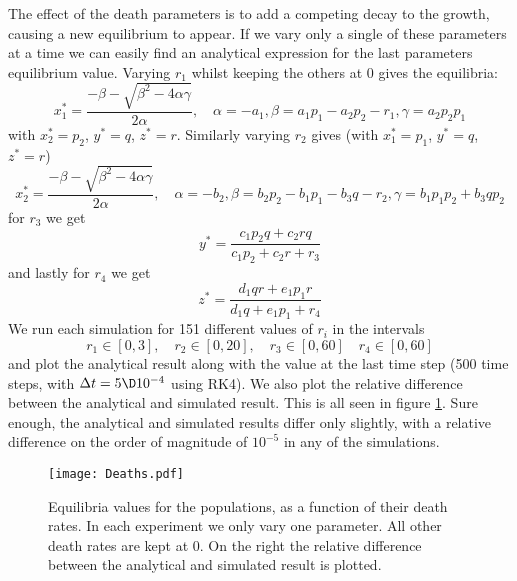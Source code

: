 \documentclass[a4paper,10pt]{article}
\begin{document}
	The effect of the death parameters is to add a competing decay to the growth, causing a new equilibrium to appear. If we vary only a single of these parameters at a time we can easily find an analytical expression for the last parameters equilibrium value. Varying $ r_1 $ whilst keeping the others at 0 gives the equilibria:
	\begin{equation}\label{key}
		x_1^* = \frac{-\beta - \sqrt{\beta^2 - 4\alpha \gamma}}{2 \alpha}, \quad \alpha=-a_1, \beta = a_1p_1-a_2p_2-r_1, \gamma =a_2p_2p_1
	\end{equation}
	with $ x_2^* = p_2 $, $ y^* = q $, $ z^* = r $. Similarly varying $ r_2 $ gives (with $ x_1^* = p_1 $, $ y^* = q $, $ z^* = r $)
	\begin{equation}\label{key}
		x_2^* = \frac{-\beta - \sqrt{\beta^2 - 4\alpha \gamma}}{2 \alpha}, \quad \alpha=-b_2, \beta = b_2p_2-b_1p_1-b_3q-r_2, \gamma =b_1p_1p_2 + b_3qp_2
	\end{equation}
	for $ r_3 $ we get
	\begin{equation}\label{key}
		y^* = \frac{c_1p_2q+c_2rq}{c_1p_2 + c_2r+r_3}
	\end{equation}
	and lastly for $ r_4 $ we get
	\begin{equation}\label{key}
		z^* = \frac{d_1 q r + e_1p_1r}{d_1q+e_1p_1+r_4}
	\end{equation}
	We run each simulation for 151 different values of $ r_i $ in the intervals
	\begin{equation}\label{key}
		r_1 \in [0,3], \quad r_2 \in [0, 20], \quad r_3 \in [0, 60] \quad r_4 \in [0, 60]
	\end{equation}
	and plot the analytical result along with the value at the last time step (500 time steps, with $ \Delta t = 5\D10^{-4} $ using RK4). We also plot the relative difference between the analytical and simulated result. This is all seen in figure \ref{fig:deaths1}. Sure enough, the analytical and simulated results differ only slightly, with a relative difference on the order of magnitude of $ 10^{-5} $ in any of the simulations.
	
	\begin{figure}[H]
		\centering
		\texttt{[image: Deaths.pdf]}
		\caption{Equilibria values for the populations, as a function of their death rates. In each experiment we only vary one parameter. All other death rates are kept at 0. On the right the relative difference between the analytical and simulated result is plotted.}
		\label{fig:deaths1}
	\end{figure}
\end{document}

